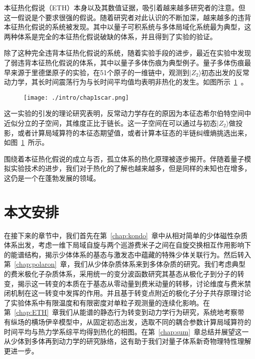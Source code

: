 本征热化假说（ETH）本身以及其数值证据，吸引着越来越多研究者的注意。但这一假说是个要求很强的假说。随着研究者对此认识的不断加深，越来越多的违背本征热化假说的系统被发现。其中以量子可积系统\cite{kinoshita2006quantum,Rigol2007Relaxation,Calabrese2011Quantum,essler2016quench,vidmar2016generalized}与多体局域化系统\cite{basko2006metal,Serbyn2013local,Huse2014Phenomenology}最为典型，这两种体系是完全的本征热化假说破缺的体系，并且得到了实验的验证。


除了这种完全违背本征热化假说的系统，随着实验手段的进步，最近在实验中发现了弱违背本征热化假说的体系，其中以量子多体伤痕为典型例子。量子多体伤痕最早来源于里德堡原子的实验，在51个原子的一维链中，观测到$|Z_2\rangle$初态出发的反常动力学，其长时间震荡行为与长时间平均值均表明非热化的发生\cite{bernien2017probing}。如图所示~\ref{scar}~。
\begin{figure}[!htbp]
    \centering
    \texttt{[image: ./intro/chap1scar.png]}
    \label{scar}
\end{figure}
这一实验的引发的理论研究表明，反常动力学存在的原因为本征态希尔伯特空间中近似分立的子空间，其维度正比于链长。这一子空间在可以通过与初态$|Z_2\rangle$做投影，或者计算局域算符的本征态期望值，或者计算本征态的半链纠缠熵挑选出来\cite{turner2018weak,Turner2018quantum,Ho2019periodic,Choi2019emergent,Michailidis2020slow,serbyn2021quantum}，如图~\ref{scar}~所示。

围绕着本征热化假说的成立与否，孤立体系的热化原理被逐步揭开。伴随着量子模拟实验技术的进步，我们对于热化的了解也越来越多，但是同样的未知也在增多，这仍是一个在蓬勃发展的领域。





\section{本文安排}\label{1sec:sum}
在接下来的章节中，我们首先在第~\ref{chap:kondo}~章中从相对简单的少体磁性杂质体系出发，考虑一维下局域自旋与两个巡游费米子之间在自旋交换相互作用影响下的能谱结构，揭示少体体系的基态与激发态中蕴藏的特殊少体关联行为。然后转入第~\ref{chap:polaron}~章，我们从少体杂质体系来到多体杂质的研究。我们考虑典型的费米极化子杂质体系，采用统一的变分波函数研究其基态从极化子到分子的转变，揭示这一转变的本质在于基态从零动量到费米动量的转移，讨论维度与费米禁闭机制在这一转变中发挥的作用。并且基于转变点附近的极化子分子共存原理讨论了实验体系中有限温度和有限密度对单粒子观测量的连续化影响。在第~\ref{chap:ETH}~章我们从能谱的静态行为转变到动力学行为研究，系统地考察带有纵场的横场伊辛模型中，从固定初态出发，选取不同的耦合参数计算局域算符的时间平均与热力学系综平均得到热化的相图。在第~\ref{chap:sum}~章总结并展望这一从少体到多体再到动力学的研究脉络，这有助于我们对量子体系新奇物理特性理解更进一步。


